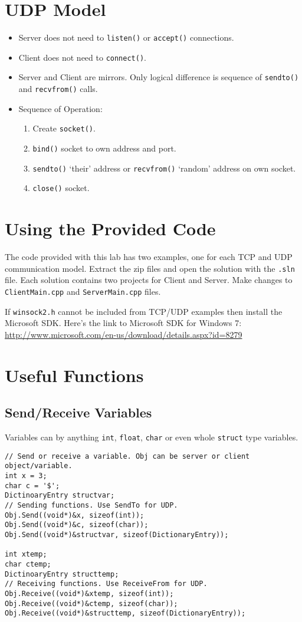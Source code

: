 \documentclass[12pt,a4paper]{article}
\begin{document}
\section{UDP Model}
\begin{itemize}
\item Server does not need to \verb|listen()| or \verb|accept()| connections.
\item Client does not need to \verb|connect()|.
\item Server and Client are mirrors. Only logical difference is sequence of \verb|sendto()| and \verb|recvfrom()| calls.
\item Sequence of Operation:
	\begin{enumerate}
    \item Create \verb|socket()|.
    \item \verb|bind()| socket to own address and port.
    \item \verb|sendto()| `their' address or \verb|recvfrom()| `random' address on own socket.
    \item \verb|close()| socket.
    \end{enumerate}
\end{itemize}
\section{Using the Provided Code}
The code provided with this lab has two examples, one for each TCP and UDP communication model. Extract the zip files and open the solution with the \verb|.sln| file. Each solution contains two projects for Client and Server. Make changes to \verb|ClientMain.cpp| and \verb|ServerMain.cpp| files.

If \verb|winsock2.h| cannot be included from TCP/UDP examples then install the Microsoft SDK. Here's the link to Microsoft SDK  for Windows 7: \url{http://www.microsoft.com/en-us/download/details.aspx?id=8279}
\section{Useful Functions}
\subsection{Send/Receive Variables}
Variables can by anything \verb|int|, \verb|float|, \verb|char| or even whole \verb|struct| type variables.
\begin{lstlisting}
// Send or receive a variable. Obj can be server or client object/variable. 
int x = 3;
char c = '$';
DictinoaryEntry structvar;
// Sending functions. Use SendTo for UDP.
Obj.Send((void*)&x, sizeof(int));
Obj.Send((void*)&c, sizeof(char));
Obj.Send((void*)&structvar, sizeof(DictionaryEntry));

int xtemp;
char ctemp;
DictinoaryEntry structtemp;
// Receiving functions. Use ReceiveFrom for UDP.
Obj.Receive((void*)&xtemp, sizeof(int));
Obj.Receive((void*)&ctemp, sizeof(char));
Obj.Receive((void*)&structtemp, sizeof(DictionaryEntry));
\end{lstlisting}
\end{document}
